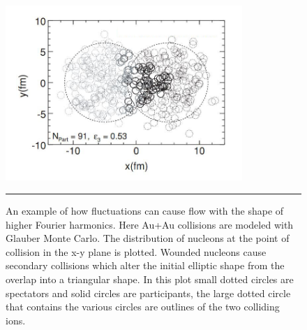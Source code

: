 \begin{figure}[htbp!]
  \centering
    \includegraphics[width=0.8\textwidth]{prevplots/phobosglauberv3.JPG}
    \rule{35em}{0.5pt}
  \caption[Triangular Flow from Fluctuations.]{An example of how fluctuations can cause flow with the shape of higher Fourier harmonics. Here Au+Au collisions are modeled with Glauber Monte Carlo. The distribution of nucleons at the point of collision in the x-y plane is plotted. Wounded nucleons cause secondary collisions which alter the initial elliptic shape from the overlap into a triangular shape\citep{Alver:2010gr}. In this plot small dotted circles are spectators and solid circles are participants, the large dotted circle that contains the various circles are outlines of the two colliding ions.}
  \label{fig:v3inauau}
\end{figure}
\pagebreak
\pagebreak
